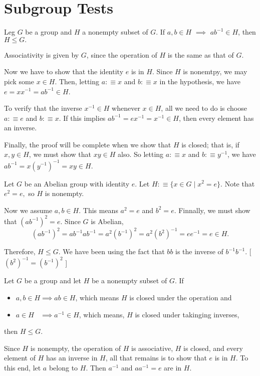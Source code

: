 \section{Subgroup Tests}
\begin{thm}
  \label{thm: One-Step Subgroup Test}
  Leg $G$ be a group and $H$ a nonempty subset of $G$. If $a,b \in H$ $\implies$ $ab^{-1} \in H$,
  then $ H \leq G.$
\end{thm}
\begin{prf}
  Associativity is given by $G$, since the operation of $H$ is the same as that of $G$.

  Now we have to show that the identity $e$ is in $H$. Since $H$ is nonemtpy, we may pick some $x \in H$. Then, letting $a :\equiv x$ and $b :\equiv x$ in the hypothesis, we have $e=xx^{-1} = ab^{-1} \in H$.

  To verify that the inverse $x^{-1} \in H$ whenever $x\in H$, all we need to do is choose $a :\equiv e$ and $b :\equiv x$. If this implies $ab^{-1}=ex^{-1}=x^{-1} \in H$, then every element has an inverse.

  Finally, the proof will be complete when we show that $H$ is closed; that is, if $x,y \in H$, we must show that $xy \in H$ also. So letting
  $a :\equiv x$ and $b :\equiv y^{-1}$, we have
  $ab^{-1} = x(y^{-1})^{-1} = xy \in H.$
\end{prf}
\begin{example}
  Let $G$ be an Abelian group with identity $e$. Let $H :\equiv \{x \in G \mid x^2 = e \}.$ Note that $e^2 = e,$ so $H$ is nonempty.

  Now we assume $a,b \in H$. This means $a^2=e$ and $b^2=e$.
  Finnally, we must show that $(ab^{-1})^2=e$. Since $G$ is Abelian,
  \begin{equation}
    (ab^{-1})^2 = ab^{-1}ab^{-1} = a^2(b^{-1})^2 =a^2(b^2)^{-1}=ee^{-1}=e \in H.
  \end{equation}

  Therefore, $H \leq G$. We have been using the fact that $bb$ is the inverse of $b^{-1}b^{-1}$. [ $(b^2)^{-1} = (b^{-1})^{2}$ ]
\end{example}

\begin{thm}
  \label{thm: Two-Step Subgroup Test}
  Let $G$ be a group and let $H$ be a nonempty subset of $G$. If
  \begin{itemize}
    \item $a,b \in H \implies ab \in H$, which means $H$ is closed under the operation and
    \item $a \in H \phantom{,b}\implies a^{-1} \in H$, which means, $H$ is closed under takinging inverses,
  \end{itemize}
  then $H \leq G$.
\end{thm}
\begin{prf}
  Since $H$ is nonempty, the operation of $H$ is associative, $H$ is closed, and every element of $H$ has an inverse in $H$, all that remains is to show that $e$ is in $H$. To this end, let $a$ belong to $H$. Then $a^{-1}$ and $aa^{-1} = e$ are in $H$.
\end{prf}

